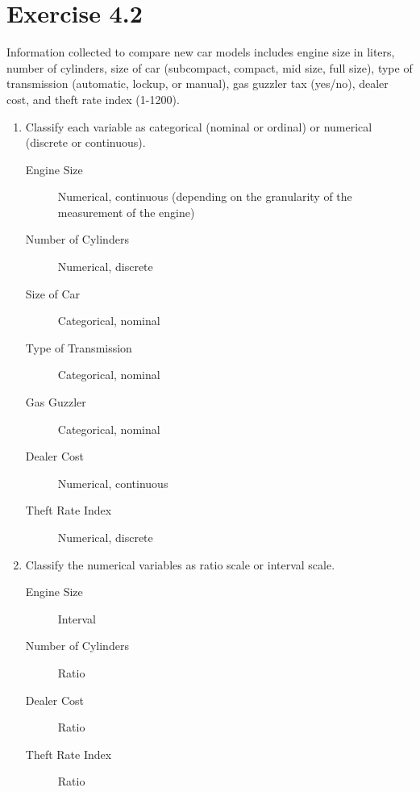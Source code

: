 \documentclass{article}
\begin{document}
\begin{minipage}{6in}
\section*{Exercise 4.2}
Information collected to compare new car models includes engine size in liters, number of cylinders, size of car (subcompact, compact, mid size, full size), type of transmission (automatic, lockup, or manual), gas guzzler tax (yes/no), dealer cost, and theft rate index (1-1200).
\begin{enumerate}[\hspace{.5em}a)]
	\item Classify each variable as categorical (nominal or ordinal) or numerical (discrete or continuous).
	\begin{description}
		\item[Engine Size] Numerical, continuous (depending on the granularity of the measurement of the engine)
		\item[Number of Cylinders] Numerical, discrete
		\item[Size of Car] Categorical, nominal
		\item[Type of Transmission] Categorical, nominal
		\item[Gas Guzzler] Categorical, nominal
		\item[Dealer Cost] Numerical, continuous
		\item[Theft Rate Index] Numerical, discrete
	\end{description}
	\item Classify the numerical variables as ratio scale or interval scale.
	\begin{description}
		\item[Engine Size] Interval
		\item[Number of Cylinders] Ratio
		\item[Dealer Cost] Ratio
		\item[Theft Rate Index] Ratio
	\end{description}
\end{enumerate}
\end{minipage}
\end{document}
